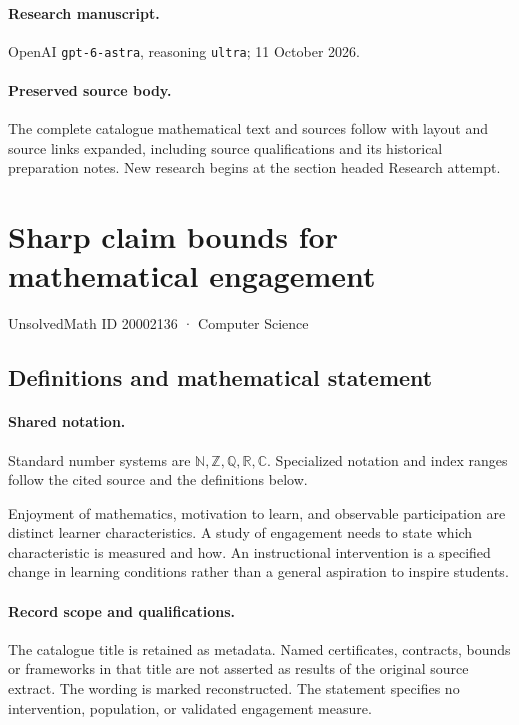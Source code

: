 \documentclass[11pt]{article}
\begin{document}
\paragraph{Research manuscript.} OpenAI \texttt{gpt-6-astra}, reasoning \texttt{ultra}; 11 October 2026.
\paragraph{Preserved source body.} The complete catalogue mathematical text and sources follow with layout and source links expanded, including source qualifications and its historical preparation notes. New research begins at the section headed Research attempt.

\section{Sharp claim bounds for mathematical engagement}\label{20002136}
{\small UnsolvedMath ID 20002136 · Computer Science}
\subsection{Definitions and mathematical statement}

\paragraph{Shared notation.}Standard number systems are $\mathbb N,\mathbb Z,\mathbb Q,\mathbb R,\mathbb C$. Specialized notation and index ranges follow the cited source and the definitions below.


Enjoyment of mathematics, motivation to learn, and observable participation are distinct learner characteristics. A study of engagement needs to state which characteristic is measured and how. An instructional intervention is a specified change in learning conditions rather than a general aspiration to inspire students.
\paragraph{Record scope and qualifications.}
The catalogue title is retained as metadata. Named certificates, contracts, bounds or frameworks in that title are not asserted as results of the original source extract.
The wording is marked reconstructed. The statement specifies no intervention, population, or validated engagement measure.
\end{document}
